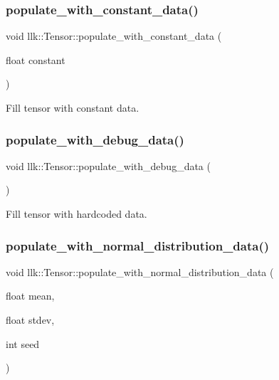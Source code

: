 \subsubsection{\texorpdfstring{populate\+\_\+with\+\_\+constant\+\_\+data()}{populate\_with\_constant\_data()}}
{\footnotesize\ttfamily void llk\+::\+Tensor\+::populate\+\_\+with\+\_\+constant\+\_\+data (\begin{DoxyParamCaption}\item[{float}]{constant }\end{DoxyParamCaption})}



Fill tensor with constant data. 

\mbox{\label{classllk_1_1Tensor_a6a90c8c3dae1a5e576cfc96f34586b09}} 
\subsubsection{\texorpdfstring{populate\+\_\+with\+\_\+debug\+\_\+data()}{populate\_with\_debug\_data()}}
{\footnotesize\ttfamily void llk\+::\+Tensor\+::populate\+\_\+with\+\_\+debug\+\_\+data (\begin{DoxyParamCaption}{ }\end{DoxyParamCaption})}



Fill tensor with hardcoded data. 

\mbox{\label{classllk_1_1Tensor_a725baaf587a492ea43ff53356cc35fc0}} 
\subsubsection{\texorpdfstring{populate\+\_\+with\+\_\+normal\+\_\+distribution\+\_\+data()}{populate\_with\_normal\_distribution\_data()}}
{\footnotesize\ttfamily void llk\+::\+Tensor\+::populate\+\_\+with\+\_\+normal\+\_\+distribution\+\_\+data (\begin{DoxyParamCaption}\item[{float}]{mean,  }\item[{float}]{stdev,  }\item[{int}]{seed }\end{DoxyParamCaption})}



